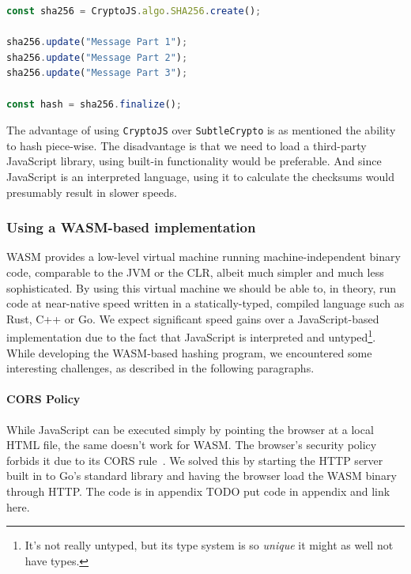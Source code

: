 \begin{lstlisting}[caption={Progressive SHA-256 hashing using CryptoJS},captionpos=b,language=JavaScript,label={lst:cryptojsprogressive}]
const sha256 = CryptoJS.algo.SHA256.create();

sha256.update("Message Part 1");
sha256.update("Message Part 2");
sha256.update("Message Part 3");

const hash = sha256.finalize();
\end{lstlisting}

The advantage of using \texttt{CryptoJS} over \texttt{SubtleCrypto} is as mentioned the ability to hash piece-wise.
The disadvantage is that we need to load a third-party JavaScript library, using built-in functionality would be preferable.
And since JavaScript is an interpreted language, using it to calculate the checksums would presumably result in slower speeds.


\subsubsection{Using a WASM-based implementation}
\label{subsubsec:wasmhashing}
\gls{WASM} provides a low-level virtual machine running machine-independent binary code, comparable to the \gls{JVM} or the \gls{CLR}, albeit much simpler and much less sophisticated.
By using this virtual machine we should be able to, in theory, run code at near-native speed written in a statically-typed, compiled language such as Rust, C++ or Go.
We expect significant speed gains over a JavaScript-based implementation due to the fact that JavaScript is interpreted and untyped\footnote{It's not really untyped, but its type system is so \textit{unique} it might as well not have types.}.
While developing the \gls{WASM}-based hashing program, we encountered some interesting challenges, as described in the following paragraphs.

\paragraph{CORS Policy} While JavaScript can be executed simply by pointing the browser at a local \gls{HTML} file, the same doesn't work for \gls{WASM}.
The browser's security policy forbids it due to its \gls{CORS} rule~\cite{cors}.
We solved this by starting the \gls{HTTP} server built in to Go's standard library and having the browser load the \gls{WASM} binary through \gls{HTTP}.
The code is in appendix TODO put code in appendix and link here.

